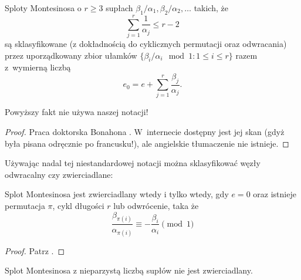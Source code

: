 \begin{proposition}
    Sploty Montesinosa o $r \ge 3$ supłach $\beta_1/\alpha_1, \beta_2/\alpha_2, \ldots$ takich, że
    \begin{equation}
        \sum_{j=1}^r \frac{1}{\alpha_j} \le r - 2
    \end{equation}
    są sklasyfikowane (z dokładnością do cyklicznych permutacji oraz odwracania) przez uporządkowany zbior ułamków $\{\beta_i/\alpha_i \mod 1 : 1 \le i \le r\}$ razem z~wymierną liczbą
    \begin{equation}
        e_0 = e + \sum_{j=1}^r \frac{\beta_j}{\alpha_j}.
    \end{equation}
\end{proposition}

Powyższy fakt nie używa naszej notacji!

\begin{proof}
%
    Praca doktorska Bonahona \cite{bonahon79}.
    W~internecie dostępny jest jej skan (gdyż była pisana odręcznie po francusku!), ale angielskie tłumaczenie nie istnieje.
\end{proof}

Używając nadal tej niestandardowej notacji można sklasyfikować węzły odwracalny czy zwierciadlane:

\begin{proposition}
%
    Splot Montesinosa jest zwierciadlany wtedy i tylko wtedy, gdy $e = 0$ oraz istnieje permutacja $\pi$, cykl długości $r$ lub odwrócenie, taka że
    \begin{equation}
        \frac{\beta_{\pi(i)}}{\alpha_{\pi(i)}} \equiv -\frac{\beta_i}{\alpha_i} \pmod 1
    \end{equation}
\end{proposition}

\begin{proof}
    Patrz \cite[s. 230]{burde14}.
\end{proof}

\begin{corollary}
    Splot Montesinosa z nieparzystą liczbą supłów nie jest zwierciadlany.
\end{corollary}

